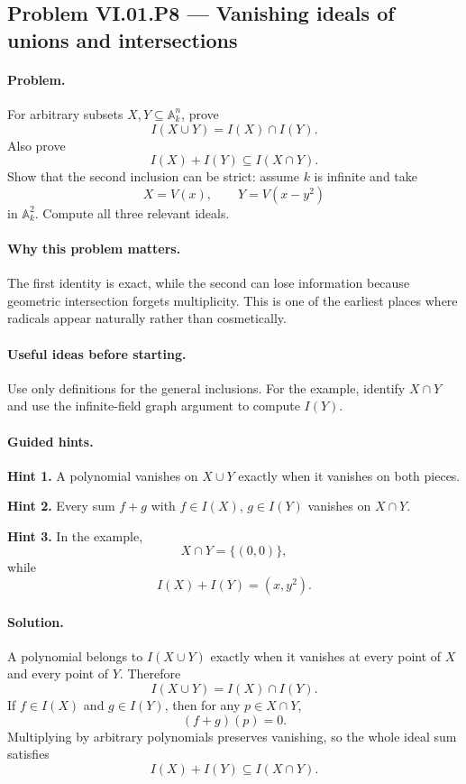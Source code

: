 \subsection*{Problem VI.01.P8 --- Vanishing ideals of unions and intersections}
\label{prob:vi01-p8}

\paragraph{Problem.}
For arbitrary subsets \(X,Y\subseteq\mathbb A_k^n\), prove
\[
I(X\cup Y)=I(X)\cap I(Y).
\]
Also prove
\[
I(X)+I(Y)\subseteq I(X\cap Y).
\]
Show that the second inclusion can be strict: assume \(k\) is infinite and take
\[
X=V(x),
\qquad
Y=V(x-y^2)
\]
in \(\mathbb A_k^2\).  Compute all three relevant ideals.

\ifdefined\FullProblemDossiers
\paragraph{Why this problem matters.}
The first identity is exact, while the second can lose information because geometric
intersection forgets multiplicity.  This is one of the earliest places where radicals
appear naturally rather than cosmetically.

\paragraph{Useful ideas before starting.}
Use only definitions for the general inclusions.  For the example, identify \(X\cap Y\)
and use the infinite-field graph argument to compute \(I(Y)\).

\paragraph{Guided hints.}
\textbf{Hint 1.} A polynomial vanishes on \(X\cup Y\) exactly when it vanishes on both
pieces.

\textbf{Hint 2.} Every sum \(f+g\) with \(f\in I(X)\), \(g\in I(Y)\) vanishes on
\(X\cap Y\).

\textbf{Hint 3.} In the example,
\[
X\cap Y=\{(0,0)\},
\]
while
\[
I(X)+I(Y)=(x,y^2).
\]

\paragraph{Solution.}
A polynomial belongs to \(I(X\cup Y)\) exactly when it vanishes at every point of \(X\)
and every point of \(Y\).  Therefore
\[
I(X\cup Y)=I(X)\cap I(Y).
\]
If \(f\in I(X)\) and \(g\in I(Y)\), then for any \(p\in X\cap Y\),
\[
(f+g)(p)=0.
\]
Multiplying by arbitrary polynomials preserves vanishing, so the whole ideal sum satisfies
\[
I(X)+I(Y)\subseteq I(X\cap Y).
\]

